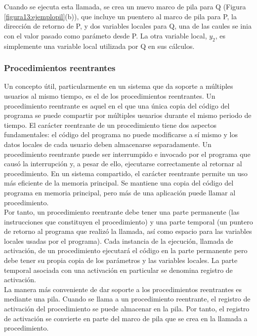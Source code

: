 \documentclass{article}
\begin{document}
							Cuando se ejecuta esta llamada, se crea un nuevo marco de pila para Q (Figura \ref{figura13:ejemplopil}(b)), que incluye un puentero al marco de pila para P, la dirección de retorno de P, y dos variables locales para Q, una de las caules se inia con el valor pasado como parámeto desde P. La otra variable local, $y_2$, es simplemente una variable local utilizada por Q en sus cálculos.
							
						\subsubsection{Procedimientos reentrantes}
							Un concepto útil, particularmente en un sistema que da soporte a múltiples usuarios al mismo tiempo, es el de los procedimientos reentrantes. Un procedimiento reentrante es aquel en el que una única copia del código del programa se puede compartir por múltiples usuarios durante el mismo periodo de tiempo. El carácter reentrante de un procedimiento tiene dos aspectos fundamentales: el código del programa no puede modificarse a sí mismo y los datos locales de cada usuario deben almacenarse separadamente. Un procedimiento reentrante puede ser interrumpido e invocado por el programa que causó la interrupción y, a pesar de ello, ejecutarse correctamente al retornar al procedimiento. En un sistema compartido, el carácter reentrante permite un  uso más eficiente de la memoria principal. Se mantiene una copia del código del programa en memoria principal, pero más de una aplicación puede llamar al procedimiento. \\
							
							Por tanto, un procedimiento reentrante debe tener una parte permanente (las instrucciones que constituyen el procedimiento) y una parte temporal (un puntero de retorno al programa que realizó la llamada, así como espacio para las variables locales usadas por el programa). Cada instancia de la ejecución, llamada de activación, de un procedimiento ejecutará el código en la parte permanente pero debe tener su propia copia de los parámetros y las variables locales. La parte temporal asociada con una activación en particular se denomina registro de activación. \\
							
							La manera más conveniente de dar soporte a los procedimientos reentrantes es mediante una pila. Cuando se llama a un procedimiento reentrante, el registro de activación del procedimiento se puede almacenar en la pila. Por tanto, el registro de activación se convierte en parte del marco de pila que se crea en la llamada a procedimiento. \\
					
\end{document}

